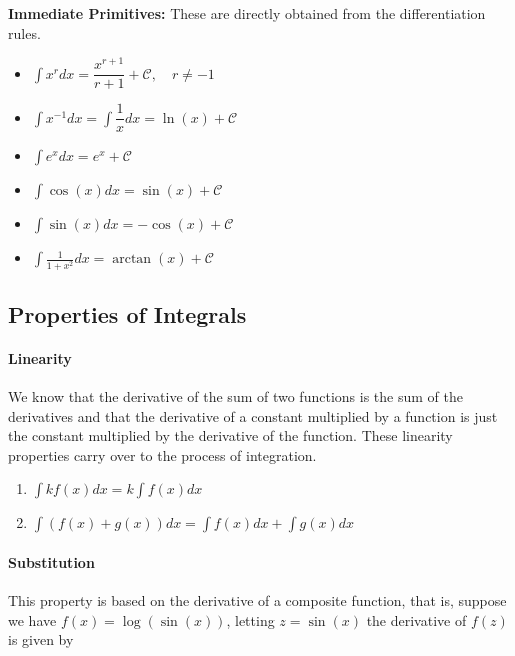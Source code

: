 \documentclass[a4paper,11pt]{article}
\theoremstyle{definition}
\theoremstyle{plain}
\begin{document}
\textbf{Immediate Primitives:} These are directly obtained from the
differentiation rules.

\begin{itemize}
	\item $\displaystyle\int x^r dx = \dfrac{x^{r+1}}{r+1} + \mathcal{C}, \quad r \neq -1$
	\item $\displaystyle\int x^{-1} dx = \displaystyle\int \dfrac{1}{x} dx = \ln(x) + \mathcal{C}$
	\item $\displaystyle\int e^x dx = e^x + \mathcal{C}$
	\item $\displaystyle\int \cos(x) dx = \sin(x) + \mathcal{C}$
	\item $\displaystyle\int \sin(x) dx = -\cos(x) + \mathcal{C}$
	\item $\displaystyle\int \frac{1}{1+x^2} dx = \arctan(x) + \mathcal{C}$
\end{itemize}


\subsection{Properties of Integrals}\label{properties-of-integrals}

\paragraph{Linearity}\label{linearity}

We know that the derivative of the sum of two functions is the sum of the derivatives and that the derivative of a constant multiplied by a function is just the constant multiplied by the derivative of the function. These linearity properties carry over to the process of integration.

\begin{enumerate}
\item \(\displaystyle\int k f(x) dx = k \displaystyle\int f(x) dx\)
\item \(\displaystyle\int (f(x) + g(x)) dx = \displaystyle\int f(x) dx + \displaystyle\int g(x) dx\)
\end{enumerate}

\paragraph{Substitution}\label{substitution}

This property is based on the derivative of a composite function, that is, suppose we have \(f(x) = \log(\sin(x))\), letting \(z = \sin(x)\) the derivative of \(f(z)\) is given by
\end{document}

